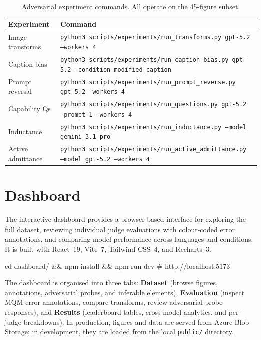 \begin{table}[H]
\centering
\scriptsize
\caption{Adversarial experiment commands. All operate on the 45-figure subset.}\label{tab:adv-commands}
\begin{tabular}{@{}l p{8cm}@{}}
\toprule
\textbf{Experiment} & \textbf{Command} \\
\midrule
Image transforms  & \texttt{python3 scripts/experiments/run\_transforms.py gpt-5.2 --workers 4} \\
Caption bias      & \texttt{python3 scripts/experiments/run\_caption\_bias.py gpt-5.2 --condition modified\_caption} \\
Prompt reversal   & \texttt{python3 scripts/experiments/run\_prompt\_reverse.py gpt-5.2 --workers 4} \\
Capability Qs     & \texttt{python3 scripts/experiments/run\_questions.py gpt-5.2 --prompt 1 --workers 4} \\
Inductance        & \texttt{python3 scripts/experiments/run\_inductance.py --model gemini-3.1-pro} \\
Active admittance & \texttt{python3 scripts/experiments/run\_active\_admittance.py --model gpt-5.2 --workers 4} \\
\bottomrule
\end{tabular}
\end{table}

\section{Dashboard}

The interactive dashboard provides a browser-based interface for exploring the full dataset, reviewing individual judge evaluations with colour-coded error annotations, and comparing model performance across languages and conditions. It is built with React~19, Vite~7, Tailwind CSS~4, and Recharts~3.

\begin{codebox}[title={\scriptsize Launch dashboard}]
{\scriptsize cd dashboard/ && npm install && npm run dev   # http://localhost:5173}
\end{codebox}

\noindent The dashboard is organised into three tabs: \textbf{Dataset} (browse figures, annotations, adversarial probes, and inferable elements), \textbf{Evaluation} (inspect MQM error annotations, compare transforms, review adversarial probe responses), and \textbf{Results} (leaderboard tables, cross-model analytics, and per-judge breakdowns). In production, figures and data are served from Azure Blob Storage; in development, they are loaded from the local \texttt{public/} directory.

